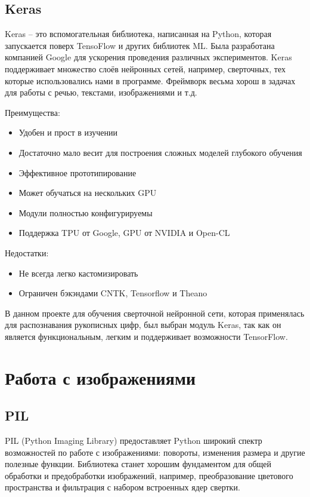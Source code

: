 \documentclass[a4paper, 12pt]{report}
\begin{document}
\pagebreak
\subsection{Keras}
Keras – это вспомогательная библиотека, написанная на Python, которая запускается поверх TensoFlow и других библиотек ML. Была разработана компанией Google для ускорения проведения различных экспериментов.
Keras поддерживает множество слоёв нейронных сетей, например, сверточных, тех которые использовались нами в программе. Фреймворк весьма хорош в задачах для работы с речью, текстами, изображениями и т.д. 

Преимущества:
\begin{itemize}
  \item Удобен и прост в изучении
  \item Достаточно мало весит для построения сложных моделей глубокого обучения
  \item Эффективное прототипирование
  \item Может обучаться на нескольких GPU
  \item Модули полностью конфигурируемы
  \item Поддержка TPU от Google, GPU от NVIDIA и Open-CL
\end{itemize}

Недостатки:
\begin{itemize}
  \item Не всегда легко кастомизировать
  \item Ограничен бэкэндами CNTK, Tensorflow и Theano
\end{itemize}

В данном проекте для обучения сверточной нейронной сети, которая применялась для распознавания рукописных цифр, был выбран модуль Keras, так как он является функциональным, легким и поддерживает возможности TensorFlow.

\section{Работа с изображениями}

\subsection{PIL}
PIL (Python Imaging Library) предоставляет Python широкий спектр возможностей по работе с изображениями: повороты, изменения размера и другие полезные функции. Библиотека станет хорошим фундаментом для общей обработки и предобработки изображений, например, преобразование цветового пространства и фильтрация с набором встроенных ядер свертки.
\end{document}
